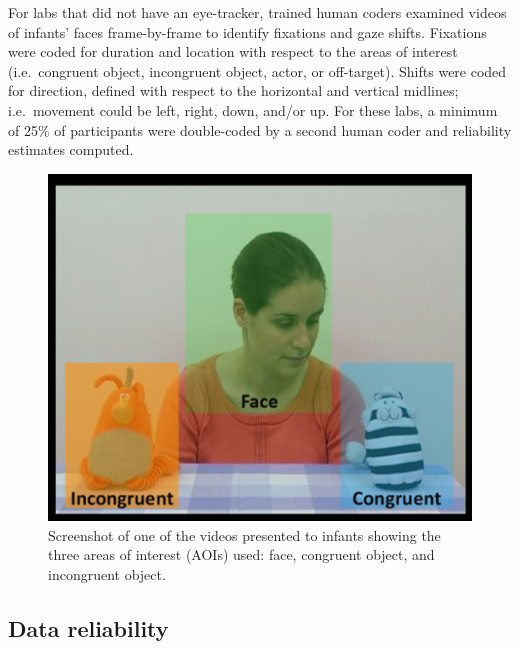 \documentclass[,man,floatsintext]{apa6}
\begin{document}
For labs that did not have an eye-tracker, trained human coders examined videos of infants' faces frame-by-frame to identify fixations and gaze shifts. Fixations were coded for duration and location with respect to the areas of interest (i.e.~congruent object, incongruent object, actor, or off-target). Shifts were coded for direction, defined with respect to the horizontal and vertical midlines; i.e.~movement could be left, right, down, and/or up. For these labs, a minimum of 25\% of participants were double-coded by a second human coder and reliability estimates computed.

\begin{figure}
\centering
\includegraphics{Figure1}
\caption{\label{fig:fig1}Screenshot of one of the videos presented to infants showing the three areas of interest (AOIs) used: face, congruent object, and incongruent object.}
\end{figure}

\hypertarget{data-reliability}{%
\subsection{Data reliability}\label{data-reliability}}
\end{document}

